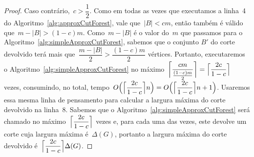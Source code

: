 \begin{proof}
	Caso contrário,~${c>\dfrac{1}{2}}$. Como em todas as vezes que
	executamos a linha~4 do Algoritmo~\ref{alg:approxCutForest}, 
	vale que~${|B|<cm}$, então também é válido que~${m-|B|>(1-c)m}$.
	Como~${m-|B|}$ é o valor do~$m$ que passamos para o 
	Algoritmo~\ref{alg:simpleApproxCutForest}, sabemos que o 
	conjunto $B'$ do corte devolvido terá mais 
	que~${\dfrac{m-|B|}{2} > \dfrac{(1-c)m}{2}}$ vértices.
	Portanto, executaremos o 
	Algoritmo~\ref{alg:simpleApproxCutForest} no 
	máximo~${\ceil[\bigg]{\dfrac{cm}{\frac{(1-c)m}{2}}} 
	=\ceil[\Big]{\dfrac{2c}{1-c}}}$ vezes, consumindo, no total,
	tempo~$O\Big(\ceil[\Big]{ \dfrac{2c}{1-c}} n\Big) = O\Big(\ceil[\Big]{ \dfrac{2c}{1-c}} n+1\Big)$.
	Usaremos essa mesma linha de pensamento para calcular a largura
	máxima do corte devolvido na linha~8. 
	Sabemos que o 
	Algoritmo~\ref{alg:simpleApproxCutForest} será 
	chamado no máximo~${\ceil[\Big]{\dfrac{2c}{1-c}}}$ 
	vezes e, para cada uma 
	das vezes, este devolve um corte cuja largura 
	máxima é~$\Delta(G)$, portanto a largura máxima do corte 
	devolvido é~${\ceil[\Big]{\dfrac{2c}{1-c}}\Delta(G)}$.
	\end{proof}




